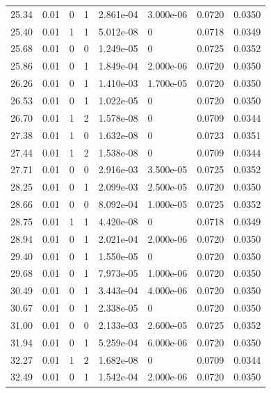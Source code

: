 \documentclass[preview]{standalone}
\begin{document}
{{{\begin{tabular}{L{1.2cm}C{1.2cm} C{0.3cm}C{0.5cm} C{1.4cm}C{1.4cm} C{1.4cm}C{1.4cm}}
  25.34  &  0.01  & 0     &  1 &  2.861e-04  & 3.000e-06  & 0.0720 &  0.0350   \\ 
  25.40  &  0.01  & 1     &  1 &  5.012e-08  & 0  & 0.0718 &  0.0349   \\ 
  25.68  &  0.01  & 0     &  0 &  1.249e-05  & 0  & 0.0725 &  0.0352   \\ 
  25.86  &  0.01  & 0     &  1 &  1.849e-04  & 2.000e-06  & 0.0720 &  0.0350   \\ 
  26.26  &  0.01  & 0     &  1 &  1.410e-03  & 1.700e-05  & 0.0720 &  0.0350   \\ 
  26.53  &  0.01  & 0     &  1 &  1.022e-05  & 0  & 0.0720 &  0.0350   \\ 
  26.70  &  0.01  & 1     &  2 &  1.578e-08  & 0  & 0.0709 &  0.0344   \\ 
  27.38  &  0.01  & 1     &  0 &  1.632e-08  & 0  & 0.0723 &  0.0351   \\ 
  27.44  &  0.01  & 1     &  2 &  1.538e-08  & 0  & 0.0709 &  0.0344   \\ 
  27.71  &  0.01  & 0     &  0 &  2.916e-03  & 3.500e-05  & 0.0725 &  0.0352   \\ 
  28.25  &  0.01  & 0     &  1 &  2.099e-03  & 2.500e-05  & 0.0720 &  0.0350   \\ 
  28.66  &  0.01  & 0     &  0 &  8.092e-04  & 1.000e-05  & 0.0725 &  0.0352   \\ 
  28.75  &  0.01  & 1     &  1 &  4.420e-08  & 0  & 0.0718 &  0.0349   \\ 
  28.94  &  0.01  & 0     &  1 &  2.021e-04  & 2.000e-06  & 0.0720 &  0.0350   \\ 
  29.40  &  0.01  & 0     &  1 &  1.550e-05  & 0  & 0.0720 &  0.0350   \\ 
  29.68  &  0.01  & 0     &  1 &  7.973e-05  & 1.000e-06  & 0.0720 &  0.0350   \\ 
  30.49  &  0.01  & 0     &  1 &  3.443e-04  & 4.000e-06  & 0.0720 &  0.0350   \\ 
  30.67  &  0.01  & 0     &  1 &  2.338e-05  & 0  & 0.0720 &  0.0350   \\ 
  31.00  &  0.01  & 0     &  0 &  2.133e-03  & 2.600e-05  & 0.0725 &  0.0352   \\ 
  31.94  &  0.01  & 0     &  1 &  5.259e-04  & 6.000e-06  & 0.0720 &  0.0350   \\ 
  32.27  &  0.01  & 1     &  2 &  1.682e-08  & 0  & 0.0709 &  0.0344   \\ 
  32.49  &  0.01  & 0     &  1 &  1.542e-04  & 2.000e-06  & 0.0720 &  0.0350   \\ 

\end{tabular}}}}
\end{document}
